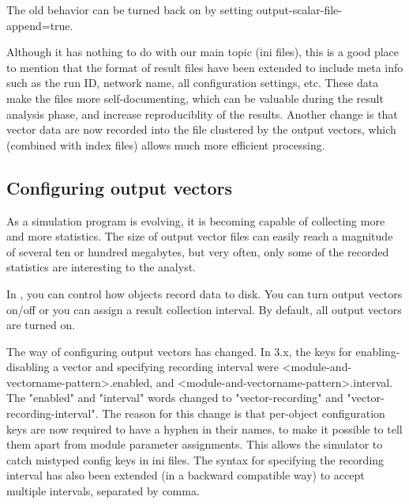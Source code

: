 \begin{note}
    The old behavior can be turned back on by setting
    output-scalar-file-append=true.
\end{note}


Although it has nothing to do with our main topic (ini files), this is a
good place to mention that the format of result files have been
extended to include meta info such as the run ID, network name, all
configuration settings, etc. These data make the files more
self-documenting, which can be valuable during the result analysis
phase, and increase reproduciblity of the results. Another change is
that vector data are now recorded into the file clustered by the output
vectors, which (combined with index files) allows much more efficient
processing.

\subsection{Configuring output vectors}
\label{sec:ch-config-sim:outvectors}


As a simulation program is evolving, it is becoming capable of
collecting more and more statistics. The size of output vector
files can easily reach a magnitude of
several ten or hundred megabytes, but very often, only some of the
recorded statistics are interesting to the analyst.

In {\opp}, you can control how  objects record data
to disk. You can turn output vectors on/off or you can assign a result
collection interval. By default, all output vectors are turned on.


\begin{note}
    The way of configuring output vectors has changed. In {\opp} 3.x,
    the keys for enabling-disabling a vector and specifying recording
    interval were <module-and-vectorname-pattern>.enabled, and 
    <module-and-vectorname-pattern>.interval. The "enabled" and "interval" 
    words changed to "vector-recording" and "vector-recording-interval".
    The reason for this change is that per-object
    configuration keys are now required to have a hyphen in their names, to
    make it possible to tell them apart from module parameter assignments.
    This allows the simulator to catch mistyped config keys in ini files.
    The syntax for specifying the recording interval has also been extended
    (in a backward compatible way) to accept multiple intervals, separated
    by comma. 
\end{note}


